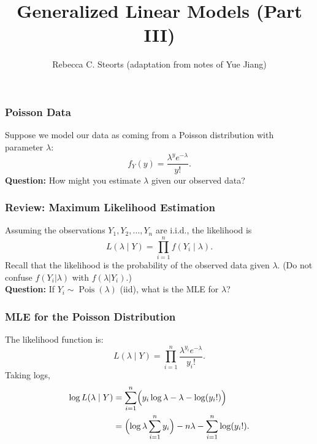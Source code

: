 \documentclass{beamer}
\title{Generalized Linear Models (Part III)}
\author{Rebecca C. Steorts (adaptation from notes of Yue Jiang)}
\begin{document}
\begin{frame}
  \titlepage
\end{frame}

\begin{frame}
\frametitle{Poisson Data}
 Suppose we model our data as coming from a Poisson distribution with parameter $\lambda$:
  \[
  f_Y(y) = \frac{\lambda^y e^{-\lambda}}{y!}.
  \]
 \textbf{Question:} How might you estimate $\lambda$ given our observed data?
\end{frame}

\begin{frame}
\frametitle{Review: Maximum Likelihood Estimation}
Assuming the observations $Y_1, Y_2, \dots, Y_n$ are i.i.d., the likelihood is
\[
L(\lambda \mid Y) = \prod_{i=1}^n f(Y_i \mid \lambda).
\]
Recall that the likelihood is the probability of the observed data given $\lambda$. (Do not confuse $f(Y_i|\lambda)$ with $f(\lambda|Y_i)$.)\\[1em]
\textbf{Question:} If $Y_i \sim \operatorname{Pois}(\lambda)$ (iid), what is the MLE for $\lambda$?
\end{frame}

\begin{frame}
\frametitle{MLE for the Poisson Distribution}
The likelihood function is:
\[
L(\lambda \mid Y) = \prod_{i=1}^n \frac{\lambda^{y_i} e^{-\lambda}}{y_i!}.
\]
Taking logs,
\begin{align}
\log L(\lambda \mid Y) 
&= \sum_{i=1}^n \Bigl( y_i \log \lambda - \lambda - \log (y_i!) \Bigr) \\
&= \Bigl(\log \lambda \sum_{i=1}^n y_i\Bigr) - n\lambda - \sum_{i=1}^n \log(y_i!).
\end{align}
\end{frame}
\end{document}
